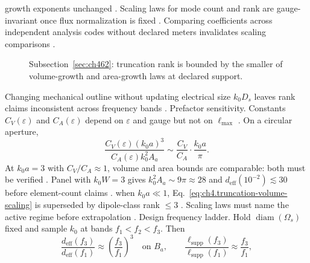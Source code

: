 growth exponents unchanged \cite{hansen1988}.
Scaling laws for mode count and rank are gauge-invariant once flux normalization is fixed \cite{stratton1941}. Comparing coefficients across independent analysis codes without declared meters invalidates scaling comparisons \cite{jackson1999}.
\begin{figure}[t]
\centering
{}
\caption{Subsection~\ref{sec:ch462}: truncation rank is bounded by the smaller of volume-growth and area-growth laws at declared support.}
\label{fig:ch4.truncation-scaling-verification}
\end{figure}
Changing mechanical outline without updating electrical size $k_{0}D_{s}$ leaves rank claims inconsistent across frequency bands \cite{jackson1999}.
Prefactor sensitivity. Constants \(C_{V}(\varepsilon)\) and \(C_{A}(\varepsilon)\) depend on \(\varepsilon\) and gauge but not on \(\ell_{\max}\)
\cite{hansen1988}. On a circular aperture,
\begin{equation}
\label{eq:ch4.scaling-ratio}
\frac{C_{V}(\varepsilon)(k_{0}a)^{3}}{C_{A}(\varepsilon)k_{0}^{2}A_{a}}
\sim
\frac{C_{V}}{C_{A}}\cdot\frac{k_{0}a}{\pi}.
\end{equation}
At \(k_{0}a=3\) with \(C_{V}/C_{A}\approx1\), volume and area bounds are comparable: both must be verified \cite{harrington2001}.
Panel with \(k_{0}W=3\) gives \(k_{0}^{2}A_{a}\sim9\pi\approx28\) and \(d_{\mathrm{eff}}(10^{-2})\lesssim30\) before element-count claims
\cite{hansen1988}.
when \(k_{0}a\ll1\), Eq.~\eqref{eq:ch4.truncation-volume-scaling} is superseded by dipole-class rank \(\le3\) \cite{jackson1999}.
Scaling laws must name the active regime before extrapolation \cite{stratton1941}.
Design frequency ladder. Hold \(\operatorname{diam}(\Omega_{s})\) fixed and sample \(k_{0}\) at bands \(f_{1}<f_{2}<f_{3}\). Then
\begin{equation}
\label{eq:ch4.freq-ladder}
\frac{d_{\mathrm{eff}}(f_{3})}{d_{\mathrm{eff}}(f_{1})}
\approx
\left(\frac{f_{3}}{f_{1}}\right)^{3}
\quad\text{on }B_{a},\qquad
\frac{\ell_{\mathrm{supp}}(f_{3})}{\ell_{\mathrm{supp}}(f_{1})}
\approx
\frac{f_{3}}{f_{1}},
\end{equation}
